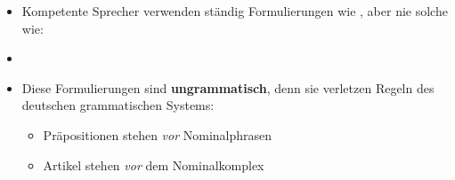 \begin{frame}

\begin{itemize}
	\item Kompetente Sprecher verwenden ständig Formulierungen wie , aber nie solche wie:

	\z
	
	\z
	
	\z
	
	\item[]
	
	\item Diese Formulierungen sind \textbf{ungrammatisch}, denn sie verletzen Regeln des deutschen grammatischen Systems:
	\begin{itemize}
		\item Präpositionen stehen \emph{vor} Nominalphrasen
		\item Artikel stehen \emph{vor} dem Nominalkomplex
	\end{itemize}	 
\end{itemize}

\end{frame}

